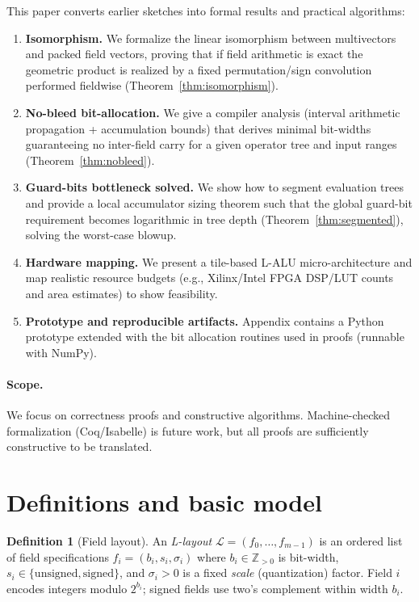 \documentclass[11pt]{article}
\theoremstyle{definition}
\newtheorem{definition}{Definition}[section]
\theoremstyle{plain}
\begin{document}
This paper converts earlier sketches into formal results and practical algorithms:
\begin{enumerate}
  \item \textbf{Isomorphism.} We formalize the linear isomorphism between multivectors and packed field vectors, proving that if field arithmetic is exact the geometric product is realized by a fixed permutation/sign convolution performed fieldwise (Theorem~\ref{thm:isomorphism}).
  \item \textbf{No-bleed bit-allocation.} We give a compiler analysis (interval arithmetic propagation + accumulation bounds) that derives minimal bit-widths guaranteeing no inter-field carry for a given operator tree and input ranges (Theorem~\ref{thm:nobleed}).
  \item \textbf{Guard-bits bottleneck solved.} We show how to segment evaluation trees and provide a local accumulator sizing theorem such that the global guard-bit requirement becomes logarithmic in tree depth (Theorem~\ref{thm:segmented}), solving the worst-case blowup.
  \item \textbf{Hardware mapping.} We present a tile-based L-ALU micro-architecture and map realistic resource budgets (e.g., Xilinx/Intel FPGA DSP/LUT counts and area estimates) to show feasibility.
  \item \textbf{Prototype and reproducible artifacts.} Appendix contains a Python prototype extended with the bit allocation routines used in proofs (runnable with NumPy).
\end{enumerate}

\paragraph{Scope.} We focus on correctness proofs and constructive algorithms. Machine-checked formalization (Coq/Isabelle) is future work, but all proofs are sufficiently constructive to be translated.

\section{Definitions and basic model}
\begin{definition}[Field layout]
An \emph{L-layout} \(\mathcal{L} = (f_0,\dots,f_{m-1})\) is an ordered list of field specifications \(f_i=(b_i,s_i,\sigma_i)\) where \(b_i\in\mathbb{Z}_{>0}\) is bit-width, \(s_i\in\{\text{unsigned},\text{signed}\}\), and \(\sigma_i>0\) is a fixed \emph{scale} (quantization) factor. Field \(i\) encodes integers modulo \(2^{b_i}\); signed fields use two's complement within width \(b_i\).
\end{definition}
\end{document}
